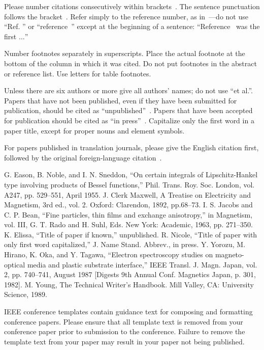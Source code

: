 \documentclass[conference]{IEEEtran}
\begin{document}
    Please number citations consecutively within brackets~\cite{b1}.
    The sentence punctuation follows the bracket~\cite{b2}.
    Refer simply to the reference number, as in~\cite{b3}---do not use ``Ref. \cite{b3}'' or ``reference~\cite{b3}'' except at the beginning of a sentence: ``Reference~\cite{b3} was the first $\ldots$''

    Number footnotes separately in superscripts.
    Place the actual footnote at
    the bottom of the column in which it was cited.
    Do not put footnotes in the abstract or reference list.
    Use letters for table footnotes.

    Unless there are six authors or more give all authors' names; do not use ``et al.''.
    Papers that have not been published, even if they have been submitted for publication, should be cited as ``unpublished''~\cite{b4}.
    Papers that have been accepted for publication should be cited as ``in press''~\cite{b5}.
    Capitalize only the first word in a paper title, except for proper nouns and element symbols.

    For papers published in translation journals, please give the English
    citation first, followed by the original foreign-language citation~\cite{b6}.

    \begin{thebibliography}{00}
         G. Eason, B. Noble, and I. N. Sneddon, ``On certain integrals of Lipschitz-Hankel type involving products of Bessel functions,'' Phil. Trans. Roy. Soc. London, vol. A247, pp. 529--551, April 1955.
         J. Clerk Maxwell, A Treatise on Electricity and Magnetism, 3rd ed., vol. 2. Oxford: Clarendon, 1892, pp.68--73.
         I. S. Jacobs and C. P. Bean, ``Fine particles, thin films and exchange anisotropy,'' in Magnetism, vol. III, G. T. Rado and H. Suhl, Eds. New York: Academic, 1963, pp. 271--350.
         K. Elissa, ``Title of paper if known,'' unpublished.
         R. Nicole, ``Title of paper with only first word capitalized,'' J. Name Stand. Abbrev., in press.
         Y. Yorozu, M. Hirano, K. Oka, and Y. Tagawa, ``Electron spectroscopy studies on magneto-optical media and plastic substrate interface,'' IEEE Transl. J. Magn. Japan, vol. 2, pp. 740--741, August 1987 [Digests 9th Annual Conf. Magnetics Japan, p. 301, 1982].
         M. Young, The Technical Writer's Handbook. Mill Valley, CA: University Science, 1989.
    \end{thebibliography}
    \vspace{12pt}
    \color{red}
    IEEE conference templates contain guidance text for composing and formatting conference papers. Please ensure that all template text is removed from your conference paper prior to submission to the conference. Failure to remove the template text from your paper may result in your paper not being published.
\end{document}
